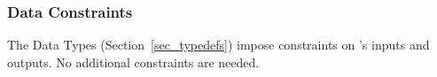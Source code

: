 \subsubsection{Data Constraints} \label{sec_DataConstraints}

The Data Types (Section~\ref{sec_typedefs}) impose constraints on \progname{}'s 
inputs and outputs. No additional constraints are needed.